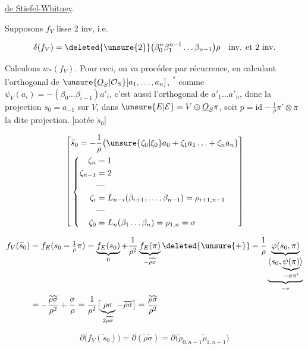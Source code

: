 
\uline{ de Stiefel-Whitney}.

Supposons $f_V$ lisse  2 inv, i.e. 

\[\delta(f_V)=\deleted{\unsure{2}}\bigl(\beta_0^n\beta_1^{n-1}\ldots\beta_{n-1}\bigr)\rho\quad\text{inv. et 2 inv.}\]

Calculons $w_*(f_V)$. Pour ceci, on va procéder par récurrence, en calculant l'orthogonal de $\unsure{\underline O_S|\mathcal O_S}[a_1,\ldots,a_n]$, \textsuperscript{*} comme $\psi_V(a_i)=-(\beta_0\ldots\beta_{i-1})a'_i$, c'est aussi l'orthogonal de $a'_1\ldots a'_n$, donc  la projection   $s_0=a_{-1}$ sur $V$, dans $\unsure{E|\mathcal E}=V\oplus\underline O_S\pi$, soit $p=\mathrm{id}-\frac1\rho\pi'\otimes\pi$ la dite projection. [notée $\widetilde s_0$]


\[\left[\begin{aligned}&\widetilde s_0=-\frac1\rho\bigl(\unsure{\zeta_0|\xi_0}a_0+\zeta_1a_1\ldots+\zeta_na_n\bigr)\\ &\left\{\begin{aligned}\zeta_n&=1\\\zeta_{n-1}&=2\\ &\text{---}\\\zeta_i&=L_{n-i}(\beta_{i+1},\ldots,\beta_{n-1})=\rho_{i+1,n-1}\\ &\text{---}\\\zeta_0&=L_n(\beta_1\ldots\beta_n)=\rho_{1,n}=\sigma\end{aligned}\right.\end{aligned}\right]\]

\[\begin{aligned}f_V(\widetilde s_0)&=f_E(s_0-\tfrac1\rho\pi)=\underbrace{f_E(s_0)}_{0}+\frac1{\rho^2}\underbrace{f_E(\pi)}_{-\widetilde\rho\widetilde\sigma}\deleted{\unsure{+}}-\frac1\rho\underbrace{\varphi(s_0,\pi)}_{\underbrace{\langle s_0,\underbrace{\psi(\pi)}_{-\sigma\pi'}\rangle}_{-\sigma}}\\ &=-\frac{\widetilde\rho\widetilde\sigma}{\rho^2}+\frac{\sigma}{\rho}=\frac1{\rho^2}\bigl[\underbrace{\rho\sigma}_{2\widetilde\rho\widetilde\sigma}-\widetilde\rho\widetilde\sigma\bigr]=\frac{\widetilde\rho\widetilde\sigma}{\rho^2}\end{aligned}\]

\[\partial\bigl(f_V(\widetilde s_0)\bigr)=\partial(\widetilde\rho\widetilde\sigma)=\partial\bigl(\widetilde\rho_{0,n-1}\widetilde\rho_{1,n-1}\bigr)\]


